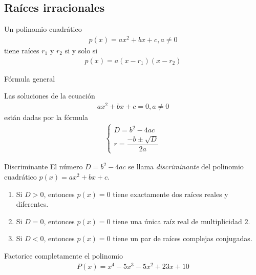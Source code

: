 \subsection{Raíces irracionales}


Un polinomio cuadrático 
\begin{align*}
	p(x)=ax^{2}+bx+c, a\neq 0
\end{align*}
tiene raíces $r_{1}$ y $r_{2}$ si y solo si 
\begin{align*}
p(x) = a\left( x-r_{1} \right)\left( x-r_{2} \right)
\end{align*}


{Fórmula general}
	\begin{proposicion}
	Las soluciones de la ecuación 
	\begin{align*}
		ax^{2}+bx+c=0, a\neq 0
\end{align*}
están dadas por la fórmula 
\begin{align*}
\begin{cases}
D = b^{2}-4ac \\
r = \dfrac{-b\pm\sqrt{D}}{2a}
\end{cases}
\end{align*}

	\end{proposicion}


{Discriminante}
El número $D=b^{2}-4ac$ se llama \emph{discriminante} del polinomio cuadrático $p(x)= ax^{2}+bx+c$.



\begin{corolario}
\begin{enumerate}
\item Si $D>0$, entonces $p(x)=0$ tiene exactamente dos raíces reales y diferentes.
\item Si $D=0$, entonces $p(x)=0$ tiene una única raíz real de multiplicidad $2$.
\item Si $D<0$, entonces $p(x)=0$ tiene un par de raíces complejas conjugadas.
\end{enumerate}

\end{corolario}



\begin{problema}
Factorice completamente el polinomio
\begin{align*}
P(x) = x^{4}-5x^{3}-5x^{2}+23x+10
\end{align*}
\end{problema}


